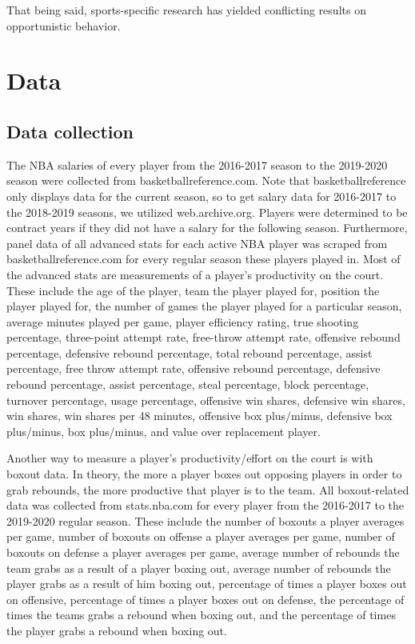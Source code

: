 \documentclass[12pt]{article}
\begin{document}
	That being said, sports-specific research has yielded conflicting results on opportunistic behavior.


	\section{Data} \label{sec:data}
	
	\subsection{Data collection}

	The NBA salaries of every player from the 2016-2017 season to the 2019-2020 season were collected from basketballreference.com. Note that basketballreference only displays data for the current season, so to get salary data for 2016-2017 to the 2018-2019 seasons, we utilized web.archive.org. Players were determined to be contract years if they did not have a salary for the following season. Furthermore, panel data of all advanced stats for each active NBA player was scraped from basketballreference.com for every regular season these players played in. Most of the advanced stats are measurements of a player's productivity on the court. These include the age of the player, team the player played for, position the player played for, the number of games the player played for a particular season, average minutes played per game, player efficiency rating, true shooting percentage, three-point attempt rate, free-throw attempt rate, offensive rebound percentage, defensive rebound percentage, total rebound percentage, assist percentage, free throw attempt rate, offensive rebound percentage, defensive rebound percentage, assist percentage, steal percentage, block percentage, turnover percentage, usage percentage, offensive win shares, defensive win shares, win shares, win shares per 48 minutes, offensive box plus/minus, defensive box plus/minus, box plus/minus, and value over replacement player. 

	Another way to measure a player's productivity/effort on the court is with boxout data. In theory, the more a player boxes out opposing players in order to grab rebounds, the more productive that player is to the team. All boxout-related data was collected from stats.nba.com for every player from the 2016-2017 to the 2019-2020 regular season. These include the number of boxouts a player averages per game, number of boxouts on offense a player averages per game, number of boxouts on defense a player averages per game, average number of rebounds the team grabs as a result of a player boxing out, average number of rebounds the player grabs as a result of him boxing out, percentage of times a player boxes out on offensive, percentage of times a player boxes out on defense, the percentage of times the teams grabs a rebound when boxing out, and the percentage of times the player grabs a rebound when boxing out. 
\end{document}
